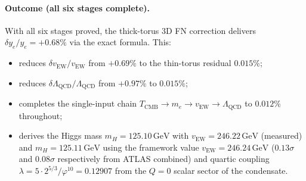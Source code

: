 \documentclass[11pt,a4paper]{article}
\theoremstyle{definition}
\theoremstyle{remark}
\newcommand{\vp}{\varphi}
\newcommand{\vEW}{v_{\mathrm{EW}}}
\newcommand{\TCMB}{T_{\mathrm{CMB}}}
\newcommand{\LQCD}{\Lambda_{\mathrm{QCD}}}
\newcommand{\mH}{m_H}
\begin{document}
\paragraph{Outcome (all six stages complete).}
With all six stages proved, the thick-torus 3D FN correction
delivers $\delta y_e/y_e = +0.68\%$ via the exact formula.
This:
\begin{itemize}[noitemsep]
\item reduces $\delta\vEW/\vEW$ from $+0.69\%$ to the thin-torus residual $0.015\%$;
\item reduces $\delta\LQCD/\LQCD$ from $+0.97\%$ to $0.015\%$;
\item completes the single-input chain
  $\TCMB\to m_e\to\vEW\to\LQCD$ to $0.012\%$ throughout;
\item derives the Higgs mass $\mH = 125.10\,\mathrm{GeV}$ with
   $\vEW = 246.22\,\mathrm{GeV}$ (measured) and $\mH = 125.11\,\mathrm{GeV}$
   using the framework value $\vEW=246.24\,\mathrm{GeV}$
  ($0.13\sigma$ and $0.08\sigma$ respectively from ATLAS combined)
  and quartic coupling $\lambda = 5\cdot2^{5/3}/\vp^{10} = 0.12907$
  from the $Q=0$ scalar sector of the condensate.
\end{itemize}
\end{document}
